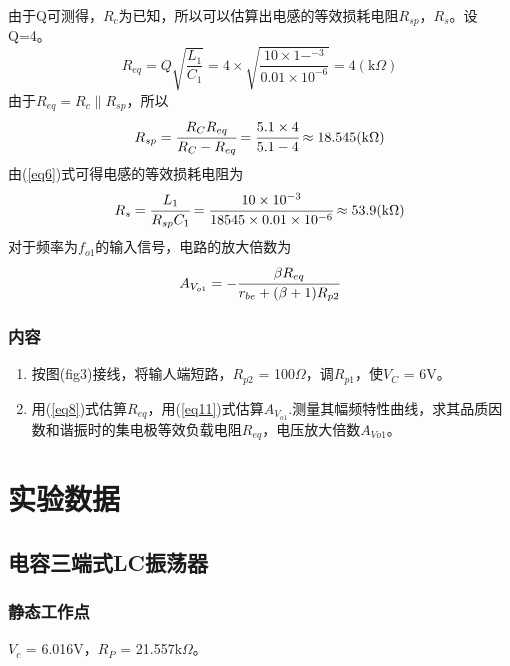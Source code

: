 \documentclass[a4paper]{article}
\begin{document}
由于Q可测得，$R_c$为已知，所以可以估算出电感的等效损耗电阻$R_{sp}$，$R_s$。设Q=4。
\begin{equation}
R_{eq} = Q\sqrt{\frac{L_1}{C_1}} = 4\times \sqrt{\frac{10\times 1-^{-3}}{0.01\times 10^{-6}}} = 4 (\text{k}\Omega)\label{eq8}
\end{equation}
由于$R_{eq} = R_c\parallel R_{sp}$，所以
\begin{equation}
R_{sp} = \cfrac{R_CR_{eq}}{R_C - R_{eq}} = \cfrac{5.1\times 4}{5.1 - 4} \approx 18.545 (\text{k}\Omega)\label{eq9}
\end{equation}
由(\ref{eq6})式可得电感的等效损耗电阻为
\begin{equation}
R_s = \cfrac{L_1}{R_{sp}C_1} = \cfrac{10\times 10^{-3}}{18545\times 0.01\times 10^{-6}} \approx 53.9 (\text{k}\Omega)\label{eq10}
\end{equation}
对于频率为$f_{o1}$的输入信号，电路的放大倍数为
\begin{eqnarray}
A_{V_{o1}} = -\cfrac{\beta R_{eq}}{r_{be}+(\beta +1)R_{p2}}\label{eq11}
\end{eqnarray}
\subsubsection{内容}
\begin{enumerate}
\item 按图(fig3)接线，将输人端短路，$R_{p2}$ = 100$\Omega$，调$R_{p1}$，使$V_C$ = 6V。
\item 用(\ref{eq8})式估箅$R_{eq}$，用(\ref{eq11})式估算$A_{V_{o1}}$.测量其幅频特性曲线，求其品质因数和谐振时的集电极等效负载电阻$R_{eq}$，电压放大倍数$A_{V{o1}}$。
\end{enumerate}

\section{实验数据}
\subsection{电容三端式LC振荡器}
\subsubsection{静态工作点}
$V_c$ = 6.016V，$R_P$ = 21.557k$\Omega$。
\end{document}
